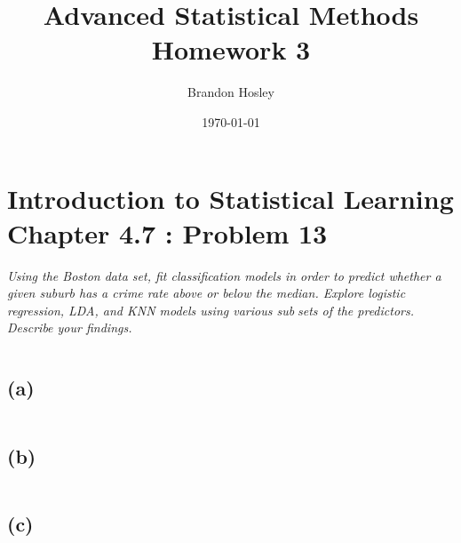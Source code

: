 \documentclass[a4paper,man,natbib]{apa6}
\title{Advanced Statistical Methods Homework 3}
\author{Brandon Hosley}
\date{\today}
\affiliation{University of Illinois - Springfield}
\begin{document}
\maketitle
\singlespacing

\section{Introduction to Statistical Learning \\ Chapter 4.7 : Problem 13}
\emph{
Using the Boston data set, fit classification models in order to predict
whether a given suburb has a crime rate above or below the median.
Explore logistic regression, LDA, and KNN models using various sub￾sets of the predictors. Describe your findings.}

\begin{verbatim}
\end{verbatim}

\subsection{(a)} 
\emph{ }
\begin{verbatim}
\end{verbatim}

\subsection{(b)}
\emph{ }
\begin{verbatim}
\end{verbatim}

\subsection{(c)}
\emph{ }
\begin{verbatim}
\end{verbatim}
	
\end{document}
